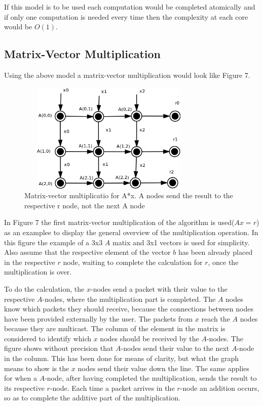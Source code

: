 \documentclass[12pt,a4paper]{article}
\begin{document}
If this model is to be used each computation would be completed atomically and if only one computation is needed every time then the complexity at each core would be $O(1)$.
\subsection{Matrix-Vector Multiplication}
Using the above model a matrix-vector multiplication would look like Figure 7. 
\begin{figure}[h!]
\includegraphics[width=250pt,height=150pt,scale=2]{Pics/mat0mult.png}
\centering
\caption{Matrix-vector multiplicatio for A*x. A nodes send the result to the respective r node, not the next A node\cite{basicinterim}}
\end{figure}

In Figure 7 the first matrix-vector multiplication of the algorithm is used($Ax=r$) as an examplee to display the general overview of the multiplication operation. In this figure the example of a 3x3 $A$ matix and 3x1 vectors is used for simplicity. Also assume that the respective element of the vector $b$ has been already placed in the respective $r$ node, waiting to complete the calculation for $r$, once the multiplication is over. 

To do the calculation, the $x$-nodes send a packet with their value to the respective $A$-nodes, where the multiplication part is completed. The $A$ nodes know which packets they should receive, because the connections between nodes have been provided externally by the user. The packets from $x$ reach the $A$ nodes because they are multicast. The column of the element in the matrix is considered to identify which $x$ nodes should be received by the $A$-nodes. The figure shows without precision that $A$-nodes send their value to the next $A$-node in the column. This has been done for means of clarity, but what the graph means to show is the $x$ nodes send their value down the line. The same applies for when a $A$-node, after having completed the multiplication, sends the result to its respective $r$-node. Each time a packet arrives in the $r$-node an addition occurs, so as to complete the additive part of the multiplication. 
\end{document}
